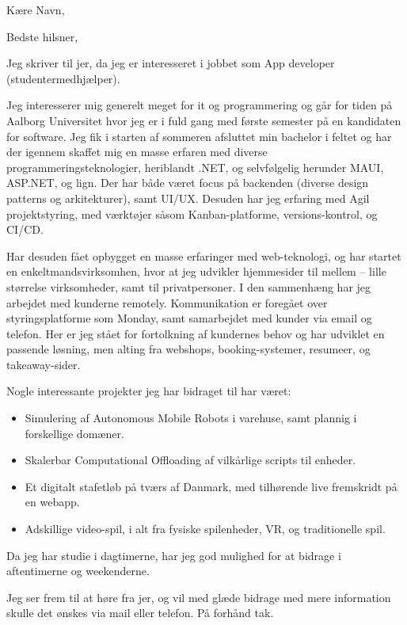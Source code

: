 \date{\today}
\opening{Kære Navn,}
\closing{Bedste hilsner,}

\makelettertitle

Jeg skriver til jer, da jeg er interesseret i jobbet som App developer (studentermedhjælper).

Jeg interesserer mig generelt meget for it og programmering og går for tiden på Aalborg Universitet hvor jeg er i fuld gang med første semester på en kandidaten for software. Jeg fik i starten af sommeren afsluttet min bachelor i feltet og har der igennem skaffet mig en masse erfaren med diverse programmeringsteknologier, heriblandt .NET, og selvfølgelig herunder MAUI, ASP.NET, og lign. Der har både været focus på backenden (diverse design patterns og arkitekturer), samt UI/UX. Desuden har jeg erfaring med Agil projektstyring, med værktøjer såsom Kanban-platforme, versions-kontrol, og CI/CD.

Har desuden fået opbygget en masse erfaringer med web-teknologi, og har startet en enkeltmandsvirksomhen, hvor at jeg udvikler hjemmesider til mellem -- lille størrelse virksomheder, samt til privatpersoner. I den sammenhæng har jeg arbejdet med kunderne remotely. Kommunikation er foregået over styringsplatforme som Monday, samt samarbejdet med kunder via email og telefon. Her er jeg stået for fortolkning af kundernes behov og har udviklet en passende løsning, men alting fra webshops, booking-systemer, resumeer, og takeaway-sider.

Nogle interessante projekter jeg har bidraget til har været:

\begin{itemize}
    \item Simulering af Autonomous Mobile Robots i varehuse, samt plannig i forskellige domæner.
    \item Skalerbar Computational Offloading af vilkårlige scripts til enheder.
    \item Et digitalt stafetløb på tværs af Danmark, med tilhørende live fremskridt på en webapp.
    \item Adskillige video-spil, i alt fra fysiske spilenheder, VR, og traditionelle spil.
\end{itemize}

Da jeg har studie i dagtimerne, har jeg god mulighed for at bidrage i aftentimerne og weekenderne.

Jeg ser frem til at høre fra jer, og vil med glæde bidrage med mere information skulle det ønskes via mail eller telefon. På forhånd tak.

\makeletterclosing
